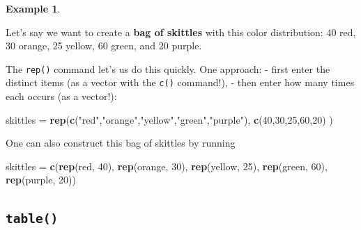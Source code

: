\documentclass[
]{book}
\newenvironment{Shaded}{\begin{snugshade}}{\end{snugshade}}
\newcommand{\DecValTok}[1]{\textcolor[rgb]{0.00,0.00,0.81}{#1}}
\newcommand{\FunctionTok}[1]{\textcolor[rgb]{0.13,0.29,0.53}{\textbf{#1}}}
\newcommand{\NormalTok}[1]{#1}
\newcommand{\OtherTok}[1]{\textcolor[rgb]{0.56,0.35,0.01}{#1}}
\newcommand{\StringTok}[1]{\textcolor[rgb]{0.31,0.60,0.02}{#1}}
\theoremstyle{definition}
\theoremstyle{definition}
\newtheorem{example}{Example}[chapter]
\theoremstyle{definition}
\theoremstyle{definition}
\theoremstyle{remark}
\begin{document}
\begin{example}
\protect\hypertarget{exm:skittles}{}\label{exm:skittles}

Let's say we want to create a \textbf{bag of skittles} with this color distribution: 40 red, 30 orange, 25 yellow, 60 green, and 20 purple.

The \texttt{rep()} command let's us do this quickly. One approach:
- first enter the distinct items (as a vector with the \texttt{c()} command!),
- then enter how many times each occurs (as a vector!):

\begin{Shaded}
\begin{Highlighting}[]
\NormalTok{skittles }\OtherTok{=} \FunctionTok{rep}\NormalTok{(}\FunctionTok{c}\NormalTok{(}\StringTok{"red"}\NormalTok{,}\StringTok{"orange"}\NormalTok{,}\StringTok{"yellow"}\NormalTok{,}\StringTok{"green"}\NormalTok{,}\StringTok{"purple"}\NormalTok{),}
               \FunctionTok{c}\NormalTok{(}\DecValTok{40}\NormalTok{,}\DecValTok{30}\NormalTok{,}\DecValTok{25}\NormalTok{,}\DecValTok{60}\NormalTok{,}\DecValTok{20}\NormalTok{)}
\NormalTok{               )}
\end{Highlighting}
\end{Shaded}

One can also construct this bag of skittles by running

\begin{Shaded}
\begin{Highlighting}[]
\NormalTok{skittles }\OtherTok{=} \FunctionTok{c}\NormalTok{(}\FunctionTok{rep}\NormalTok{(}\StringTok{\textquotesingle{}red\textquotesingle{}}\NormalTok{, }\DecValTok{40}\NormalTok{),}
             \FunctionTok{rep}\NormalTok{(}\StringTok{\textquotesingle{}orange\textquotesingle{}}\NormalTok{, }\DecValTok{30}\NormalTok{),}
             \FunctionTok{rep}\NormalTok{(}\StringTok{\textquotesingle{}yellow\textquotesingle{}}\NormalTok{, }\DecValTok{25}\NormalTok{),}
             \FunctionTok{rep}\NormalTok{(}\StringTok{\textquotesingle{}green\textquotesingle{}}\NormalTok{, }\DecValTok{60}\NormalTok{),}
             \FunctionTok{rep}\NormalTok{(}\StringTok{\textquotesingle{}purple\textquotesingle{}}\NormalTok{, }\DecValTok{20}\NormalTok{))}
\end{Highlighting}
\end{Shaded}

\end{example}

\subsection*{\texorpdfstring{\texttt{table()}}{table()}}\label{table}
\end{document}
